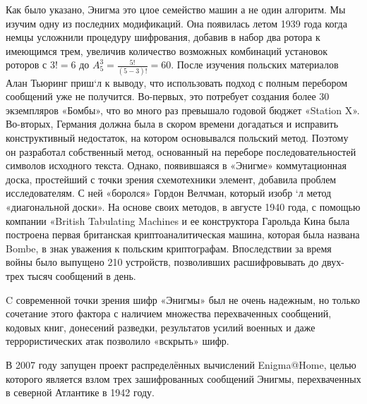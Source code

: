 Как было указано, Энигма это цлое семейство машин а не один 
алгоритм. Мы изучим одну из последних модификаций. Она появилась
летом 1939 года когда немцы усложнили процедуру шифрования, добавив 
в набор два ротора к имеющимся трем, увеличив количество возможных комбинаций 
установок роторов с $3! = 6$ до 
$A_5^3 = \frac{{5!}}{{\left( {5 - 3} \right)!}} = 60$. 
После изучения польских материалов Алан Тьюринг 
приш`л к выводу, что использовать подход с полным перебором сообщений 
уже не получится. Во-первых, это потребует создания более 30 
экземпляров «Бомбы», что во много раз превышало годовой бюджет 
«Station X». Во-вторых, Германия должна была в скором времени 
догадаться и исправить конструктивный недостаток, на котором 
основывался польский метод. Поэтому он разработал собственный 
метод, основанный на переборе последовательностей символов исходного 
текста. Однако, появившаяся в «Энигме» коммутационная доска, 
простейший с точки зрения схемотехники элемент, добавила проблем 
исследователям. С ней «боролся» Гордон Велчман, который изобр
`л метод «диагональной доски». На основе своих методов, в августе 
1940 года, с помощью компании «British Tabulating Machines
и ее конструктора Гарольда Кина была 
построена первая британская криптоаналитическая машина, которая 
была названа Bombe, в знак уважения к польским криптографам. 
Впоследствии за время войны было выпущено 210 устройств, позволивших 
расшифровывать до двух-трех тысяч сообщений в день.

C современной точки зрения шифр «Энигмы» был не очень надежным,
но только сочетание этого фактора с наличием множества перехваченных 
сообщений, кодовых книг, донесений разведки, результатов усилий 
военных и даже террористических атак позволило «вскрыть» шифр.

В 2007 году запущен проект распределённых вычислений Enigma@Home, 
целью которого является взлом трех зашифрованных сообщений Энигмы, 
перехваченных в северной Атлантике в 1942 году.
